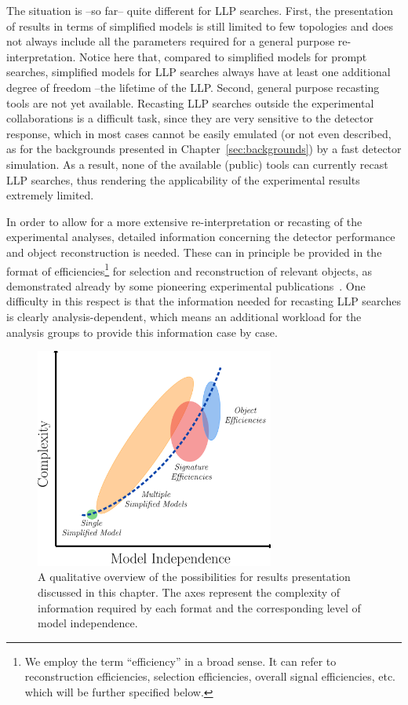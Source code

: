 The situation is --so far-- quite different for LLP searches. 
First, the presentation of results in terms of simplified models 
is still limited to few topologies and does not always include all the
parameters required for a general purpose re-interpretation. 
Notice here that, compared to simplified models for prompt searches, simplified models 
for LLP searches always have at least one additional degree of freedom --the lifetime of the LLP. 
Second, general purpose recasting tools are not yet available.
Recasting LLP searches outside the experimental collaborations is  a
difficult task, since they are very sensitive to the detector response, which in most cases 
cannot be easily emulated (or not even described, as for the backgrounds presented in 
Chapter~\ref{sec:backgrounds}) by a fast detector simulation.
As a result, none of the available (public) tools can currently recast
LLP searches, thus rendering the applicability of the experimental
results extremely limited. 


In order to allow for a more extensive re-interpretation or recasting of 
the experimental analyses, detailed information concerning the detector
performance and object reconstruction is needed.
These can in principle be provided in the format of efficiencies\footnote{We
employ the term ``efficiency'' in a broad sense. It can refer to reconstruction
efficiencies, selection efficiencies, overall signal efficiencies, etc. which will be further specified below.}
for selection and reconstruction of relevant objects, as demonstrated
already by some pioneering experimental publications~\cite{Khachatryan:2015lla,Aaboud:2017iio}.
One difficulty in this respect is that the information needed for recasting LLP searches is clearly
analysis-dependent, which means an additional workload for the analysis groups to provide this information 
case by case.  

\begin{figure}[t]
\begin{center}
\includegraphics[width=0.7\textwidth,angle=0]{ch5-figures/LLP_interpretationsB.png}
\end{center}
\caption{A qualitative overview of the possibilities
for results presentation discussed in this chapter.
The axes represent the complexity of information required by each
format and the corresponding level of model independence.}
\label{fig:ch5-complexity-vs-modelindependence}
\end{figure}

